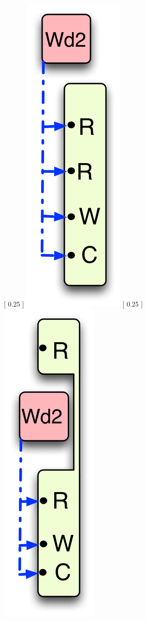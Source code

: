 \begin{figure}
\centering
\subcaptionbox {
  \label{fig:hb-eg-1}
} [
  0.25\columnwidth
] {
  \includegraphics[scale=0.45]{Figures/hb-eg-1}
}
\subcaptionbox {
  \label{fig:hb-eg-2}
} [
  0.25\columnwidth
] {
  \includegraphics[scale=0.45]{Figures/hb-eg-2}
}
\end{figure}
